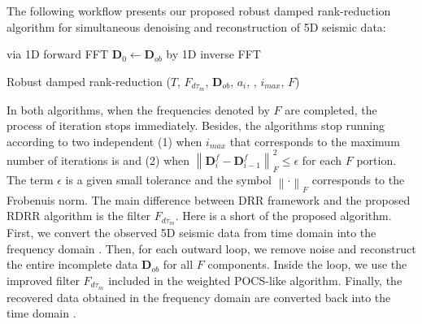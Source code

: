 The following workflow presents our proposed robust damped rank-reduction algorithm for simultaneous denoising and reconstruction of 5D seismic data:

\begin{center}
	\begin{algorithm}[H]
		\DontPrintSemicolon
		 via 1D forward FFT\;    
		$\mathbf{D}_0\leftarrow\mathbf{D}_{ob}$\;
		 by 1D inverse FFT\;		
		\caption{Robust damped rank-reduction ($T$, {${F}_{d\tau_m}$}, $\mathbf{D}_{ob}$, $a_{i}$, \wen{$\epsilon$}, $i_{max}$, $F$)}
	\end{algorithm}
\end{center}

In both algorithms, when the frequencies denoted by ${F}$ are completed, the process of iteration stops immediately. Besides, the algorithms stop running according to two independent  (1) when {$i_{max}$} that corresponds to the maximum number of iterations is  and (2) when {$\left\|\mathbf{D}^f_i - \mathbf{D}^f_{i-1}\right\|_F^2\leq \epsilon$} for each ${F}$ portion. The term $\epsilon$ is a given small tolerance and the symbol {$\left\|\cdot\right\|_F$} corresponds to the Frobenuis norm. The main difference between DRR framework and the proposed RDRR algorithm is the filter {${F}_{d\tau_m}$}. Here is a short  of the proposed algorithm. First, we convert the observed 5D seismic data from time domain  into the frequency domain . Then, for each outward loop, we remove noise and reconstruct the entire incomplete data {$\mathbf{D}_{ob}$} for all ${F}$ components. Inside the loop, we use the improved filter {${F}_{d\tau_m}$} included in the weighted POCS-like algorithm. Finally, the recovered data  obtained in the frequency domain are converted back into the time domain .

